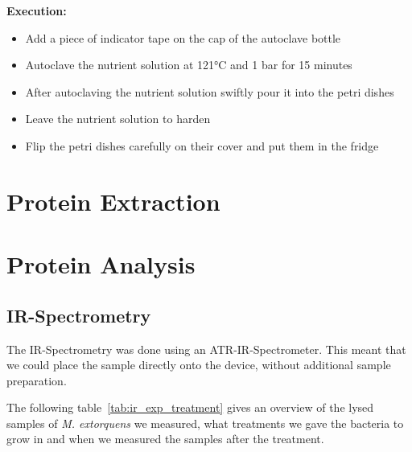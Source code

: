 \textbf{Execution:}

\begin{itemize}
    \item Add a piece of indicator tape on the cap of the autoclave bottle
    \item Autoclave the nutrient solution at 121°C and 1 bar for 15 minutes
    \item After autoclaving the nutrient solution swiftly pour it into the petri dishes
    \item Leave the nutrient solution to harden
    \item Flip the petri dishes carefully on their cover and put them in the fridge
\end{itemize}


\section{Protein Extraction\authorB}


\section{Protein Analysis\authorA}

\subsection{IR-Spectrometry}

The IR-Spectrometry was done using an ATR-IR-Spectrometer.
This meant that we could place the sample directly onto the device, without additional sample preparation.

The following table~\ref{tab:ir_exp_treatment} gives an overview of the lysed samples of \emph{M. extorquens} we measured, what treatments we gave the bacteria to grow in and when we measured the samples after the treatment.

